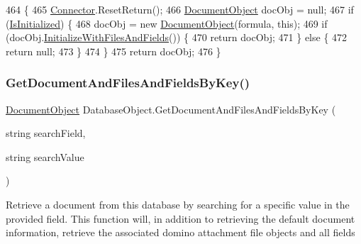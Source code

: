 \begin{DoxyCode}
464                                                                                 \{
465         \mbox{\hyperlink{class_connector}{Connector}}.ResetReturn();
466         \mbox{\hyperlink{class_document_object}{DocumentObject}} docObj = null;
467         \textcolor{keywordflow}{if} (\mbox{\hyperlink{class_database_object_a5fe036d32a30eb10d1b3f6a30263f740}{IsInitialized}}) \{
468             docObj = \textcolor{keyword}{new} \mbox{\hyperlink{class_document_object}{DocumentObject}}(formula, \textcolor{keyword}{this});
469             \textcolor{keywordflow}{if} (docObj.\mbox{\hyperlink{class_document_object_a16350c0f471c95c82b418b7f1dc53694}{InitializeWithFilesAndFields}}()) \{
470                 \textcolor{keywordflow}{return} docObj;
471             \} \textcolor{keywordflow}{else} \{
472                 \textcolor{keywordflow}{return} null;
473             \}
474         \}
475         \textcolor{keywordflow}{return} docObj;
476     \}
\end{DoxyCode}
\mbox{\label{class_database_object_a6fb63750e0d3ecb2393c8d416122f5d9}} 
\subsubsection{\texorpdfstring{Get\+Document\+And\+Files\+And\+Fields\+By\+Key()}{GetDocumentAndFilesAndFieldsByKey()}\hspace{0.1cm}{\footnotesize\ttfamily [1/2]}}
{\footnotesize\ttfamily \mbox{\hyperlink{class_document_object}{Document\+Object}} Database\+Object.\+Get\+Document\+And\+Files\+And\+Fields\+By\+Key (\begin{DoxyParamCaption}\item[{string}]{search\+Field,  }\item[{string}]{search\+Value }\end{DoxyParamCaption})}



Retrieve a document from this database by searching for a specific value in the provided field. This function will, in addition to retrieving the default document information, retrieve the associated domino attachment file objects and all fields 

